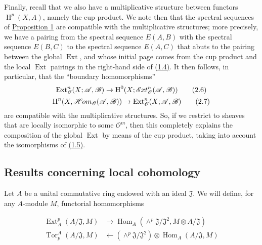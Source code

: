 \documentclass{article}
\newenvironment{eqenv}
  {}
  {}
\newcommand{\oldpage}[1]{\marginpar{\footnotesize$\Big\vert$ \textit{p.~#1}}}
\theoremstyle{definition}
\theoremstyle{definition}
\theoremstyle{definition}
\theoremstyle{definition}
\theoremstyle{remark}
\begin{document}
\oldpage{149-05}Finally, recall that we also have a multiplicative structure between functors \(\operatorname{H}^p(X,A)\), namely the cup product.
We note then that the spectral sequences of \protect\hyperlink{fga-1-proposition-1}{Proposition 1} are compatible with the multiplicative structures;
more precisely, we have a pairing from the spectral sequence \(E(A,B)\) with the spectral sequence \(E(B,C)\) to the spectral sequence \(E(A,C)\) that abuts to the pairing between the global \(\operatorname{Ext}\), and whose initial page comes from the cup product and the local \(\operatorname{Ext}\) pairings in the right-hand side of \protect\hyperlink{fga-1-equation-1.4}{(1.4)}.
It then follows, in particular, that the ``boundary homomorphisms''
\[
  \operatorname{Ext}_{\mathscr{O}}^n(X;{\mathscr{A}},{\mathscr{B}}) \to \operatorname{H}^0(X;\mathscr{E}\kern -.5pt xt_{\mathscr{O}}^n({\mathscr{A}},{\mathscr{B}}))
\tag{2.6}
\]
\[
  \operatorname{H}^n(X,\mathscr{H}\kern -.5pt om_{\mathscr{O}}({\mathscr{A}},{\mathscr{B}})) \to \operatorname{Ext}_{\mathscr{O}}^n(X;{\mathscr{A}},{\mathscr{B}})
\tag{2.7}
\]
are compatible with the multiplicative structures.
So, if we restrict to sheaves that are locally isomorphic to some \({\mathscr{O}}^m\), then this completely explains the composition of the global \(\operatorname{Ext}\) by means of the cup product, taking into account the isomorphisms of \protect\hyperlink{fga-1-equation-1.5}{(1.5)}.

\hypertarget{fga-1-section-3}{%
\subsection{Results concerning local cohomology}\label{fga-1-section-3}}

Let \(A\) be a unital commutative ring endowed with an ideal \({\mathfrak{J}}\).
We will define, for any \(A\)-module \(M\), functorial homomorphisms

\leavevmode{}%
\begin{eqenv}
\[
  \begin{aligned}
    \operatorname{Ext}_A^p(A/{\mathfrak{J}},M) &\to \operatorname{Hom}_A(\wedge^p{\mathfrak{J}}/{\mathfrak{J}}^2,M\otimes A/{\mathfrak{J}})
  \\\operatorname{Tor}_p^A(A/{\mathfrak{J}},M) &\leftarrow(\wedge^p{\mathfrak{J}}/{\mathfrak{J}}^2)\otimes\operatorname{Hom}_A(A/{\mathfrak{J}},M)
  \end{aligned}
\tag{3.1}
\]

\end{eqenv}
\end{document}
